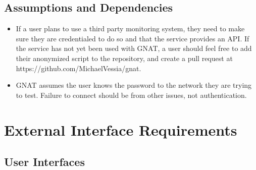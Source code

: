\documentclass{scrreprt}
\def\sourcecode{https://github.com/MichaelVessia/gnat}
\begin{document}
\section{Assumptions and Dependencies}

\begin{itemize}
\item If a user plans to use a third party monitoring system, they need to make sure they are credentialed to do so and that the service provides an API\@. If the service has not yet been used with GNAT, a user should feel free to add their anonymized script to the repository, and create a pull request at \sourcecode.
\item GNAT assumes the user knows the password to the network they are trying to test.  Failure to connect should be from other issues, not authentication.
\end{itemize}

\chapter{External Interface Requirements}

\section{User Interfaces}
\end{document}
